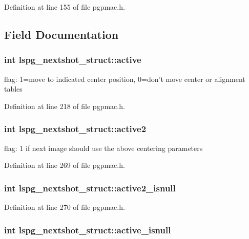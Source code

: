 Definition at line 155 of file pgpmac.h.

\subsection{Field Documentation}
\hypertarget{structlspg__nextshot__struct_a1a94eefbad713976a3d9213695a6ca28}{
\subsubsection[{active}]{\setlength{\rightskip}{0pt plus 5cm}int {\bf lspg\_\-nextshot\_\-struct::active}}}
\label{structlspg__nextshot__struct_a1a94eefbad713976a3d9213695a6ca28}


flag: 1=move to indicated center position, 0=don't move center or alignment tables 

Definition at line 218 of file pgpmac.h.\hypertarget{structlspg__nextshot__struct_a2875aa18df587806a3d8c05220fd62b5}{
\subsubsection[{active2}]{\setlength{\rightskip}{0pt plus 5cm}int {\bf lspg\_\-nextshot\_\-struct::active2}}}
\label{structlspg__nextshot__struct_a2875aa18df587806a3d8c05220fd62b5}


flag: 1 if next image should use the above centering parameters 

Definition at line 269 of file pgpmac.h.\hypertarget{structlspg__nextshot__struct_a1aa11ff4a4c8d69695786b4349e84e6b}{
\subsubsection[{active2\_\-isnull}]{\setlength{\rightskip}{0pt plus 5cm}int {\bf lspg\_\-nextshot\_\-struct::active2\_\-isnull}}}
\label{structlspg__nextshot__struct_a1aa11ff4a4c8d69695786b4349e84e6b}


Definition at line 270 of file pgpmac.h.\hypertarget{structlspg__nextshot__struct_a9f777671ec617a0f533b3c51f28babb3}{
\subsubsection[{active\_\-isnull}]{\setlength{\rightskip}{0pt plus 5cm}int {\bf lspg\_\-nextshot\_\-struct::active\_\-isnull}}}
\label{structlspg__nextshot__struct_a9f777671ec617a0f533b3c51f28babb3}


